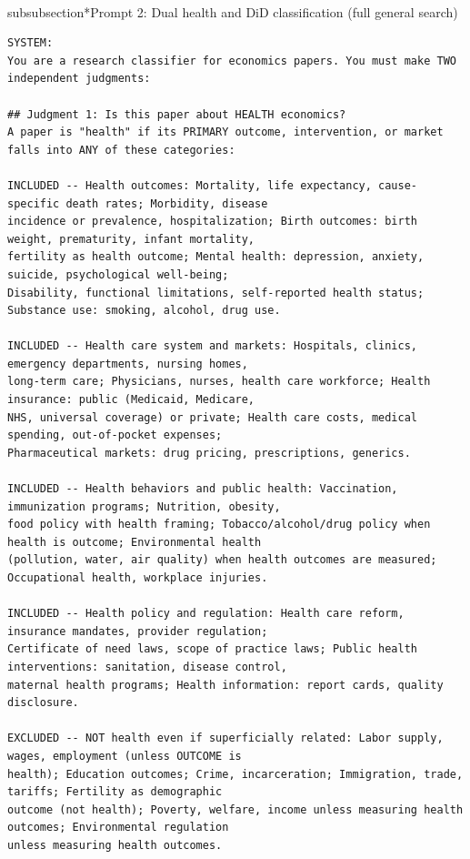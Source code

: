 \\subsubsection*{Prompt 2: Dual health and DiD classification (full general search)}

\begin{tcolorbox}[colback=gray!5, colframe=gray!60, breakable]
\tiny
\begin{verbatim}
SYSTEM:
You are a research classifier for economics papers. You must make TWO independent judgments:

## Judgment 1: Is this paper about HEALTH economics?
A paper is "health" if its PRIMARY outcome, intervention, or market falls into ANY of these categories:

INCLUDED -- Health outcomes: Mortality, life expectancy, cause-specific death rates; Morbidity, disease
incidence or prevalence, hospitalization; Birth outcomes: birth weight, prematurity, infant mortality,
fertility as health outcome; Mental health: depression, anxiety, suicide, psychological well-being;
Disability, functional limitations, self-reported health status; Substance use: smoking, alcohol, drug use.

INCLUDED -- Health care system and markets: Hospitals, clinics, emergency departments, nursing homes,
long-term care; Physicians, nurses, health care workforce; Health insurance: public (Medicaid, Medicare,
NHS, universal coverage) or private; Health care costs, medical spending, out-of-pocket expenses;
Pharmaceutical markets: drug pricing, prescriptions, generics.

INCLUDED -- Health behaviors and public health: Vaccination, immunization programs; Nutrition, obesity,
food policy with health framing; Tobacco/alcohol/drug policy when health is outcome; Environmental health
(pollution, water, air quality) when health outcomes are measured; Occupational health, workplace injuries.

INCLUDED -- Health policy and regulation: Health care reform, insurance mandates, provider regulation;
Certificate of need laws, scope of practice laws; Public health interventions: sanitation, disease control,
maternal health programs; Health information: report cards, quality disclosure.

EXCLUDED -- NOT health even if superficially related: Labor supply, wages, employment (unless OUTCOME is
health); Education outcomes; Crime, incarceration; Immigration, trade, tariffs; Fertility as demographic
outcome (not health); Poverty, welfare, income unless measuring health outcomes; Environmental regulation
unless measuring health outcomes.


\end{verbatim}
\end{tcolorbox}

